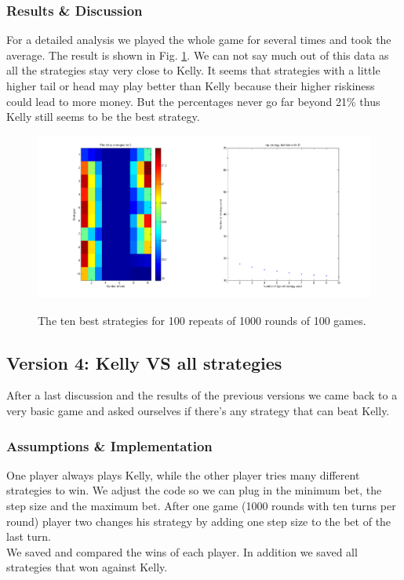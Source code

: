 \documentclass[11pt]{article}
\begin{document}
\subsubsection{Results \& Discussion}
For a detailed analysis we played the whole game for several times and took the average. The result is shown in Fig. \ref{results v3}. We can not say much out of this data as all the strategies stay very close to Kelly. It seems that strategies with a little higher tail or head may play better than Kelly because their higher riskiness could lead to more money. But the percentages never go far beyond 21\% thus Kelly still seems to be the best strategy.
\begin{figure}
	\includegraphics[scale=0.4]{result_V3}
	\centering
	\label{results v3}
	\caption{The ten best strategies for 100 repeats of 1000 rounds of 100 games.}
\end{figure}

\subsection{Version 4: Kelly VS all strategies}
After a last discussion and the results of the previous versions we came back to a very basic game and asked ourselves if there's any strategy that can beat Kelly.

\subsubsection{Assumptions \& Implementation}
One player always plays Kelly, while the other player tries many different strategies to win. We adjust the code so we can plug in the minimum bet, the step size and the maximum bet. After one game (1000 rounds with ten turns per round) player two changes his strategy by adding one step size to the bet of the last turn. \\
We saved and compared the wins of each player. In addition we saved all strategies that won against Kelly.
\end{document}
